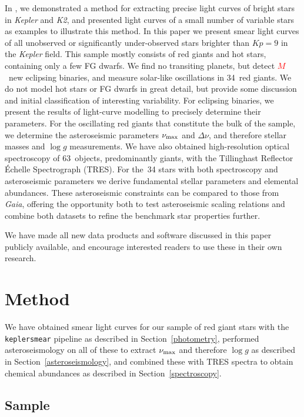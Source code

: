 \documentclass[a4paper,fleqn,usenatbib]{mnras}
\newcommand{\numax}{\mbox{$\nu_{\rm max}$}\xspace}
\newcommand{\Dnu}{\mbox{$\Delta \nu$}\xspace}
\newcommand{\logg}{\mbox{$\log g$}\xspace}
\newcommand{\kepler}{\emph{Kepler}\xspace}
\newcommand{\ktwo}{\emph{K2}\xspace}
\newcommand{\gaia}{\emph{Gaia}\xspace}
\begin{document}
In \citet{smear}, we demonstrated a method for extracting precise light curves of bright stars in \kepler and \ktwo, and presented light curves of a small number of variable stars as examples to illustrate this method. In this paper we present smear light curves of all unobserved or significantly under-observed stars brighter than $Kp=9$ in the \kepler field. This sample mostly consists of red giants and hot stars, containing only a few FG dwarfs. We find no transiting planets, but detect \textcolor{red}{$M$}~new eclipsing binaries, and measure solar-like oscillations in 34~red giants. We do not model hot stars or FG dwarfs in great detail, but provide some discussion and initial classification of interesting variability. For eclipsing binaries, we present the results of light-curve modelling to precisely determine their parameters. For the oscillating red giants that constitute the bulk of the sample, we determine the asteroseismic parameters \numax and \Dnu, and therefore stellar masses and \logg measurements. We have also obtained high-resolution optical spectroscopy of 63~objects, predominantly giants, with the Tillinghast Reflector \'{E}chelle Spectrograph (TRES). For the~34 stars with both spectroscopy and asteroseismic parameters we derive fundamental stellar parameters and elemental abundances. These asteroseismic constraints can be compared to those from \gaia, offering the opportunity both to test asteroseismic scaling relations and combine both datasets to refine the benchmark star properties further.

We have made all new data products and software discussed in this paper publicly available, and encourage interested readers to use these in their own research.   

\section{Method}
\label{method}

We have obtained smear light curves for our sample of red giant stars with the \texttt{keplersmear} pipeline as described in Section~\ref{photometry}, performed asteroseismology on all of these to extract \numax and therefore \logg as described in Section~\ref{asteroseismology}, and combined these with TRES spectra to obtain chemical abundances as described in Section~\ref{spectroscopy}. 

\subsection{Sample}
\label{sample}
\end{document}
